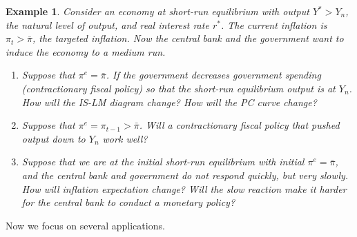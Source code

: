 \documentclass[12pt]{article}
\newtheorem{example}{Example}
\begin{document}
\begin{example}
  Consider an economy at short-run equilibrium with output $Y^*>Y_n$, the natural level of output, and real interest rate $r^*$. The current inflation is $\pi_t>\bar{\pi}$, the targeted inflation. Now the central bank and the government want to induce the economy to a medium run.
  \begin{enumerate}[label=(\arabic*)]
    \item Suppose that $\pi^e = \bar{\pi}$. If the government decreases government spending (contractionary fiscal policy) so that the short-run equilibrium output is at $Y_n$. How will the IS-LM diagram change? How will the PC curve change? 
    \vspace{100pt}
    \item Suppose that $\pi^e = \pi_{t-1} > \bar{\pi}$. Will a contractionary fiscal policy that pushed output down to $Y_n$ work well?
    \vspace{100pt}
    \item Suppose that we are at the initial short-run equilibrium with initial $\pi^e = \bar{\pi}$, and the central bank and government do not respond quickly, but very slowly. How will inflation expectation change? Will the slow reaction make it harder for the central bank to conduct a monetary policy?
    \vspace{100pt}
  \end{enumerate}
\end{example}
\newpage
Now we focus on several applications.
\end{document}
